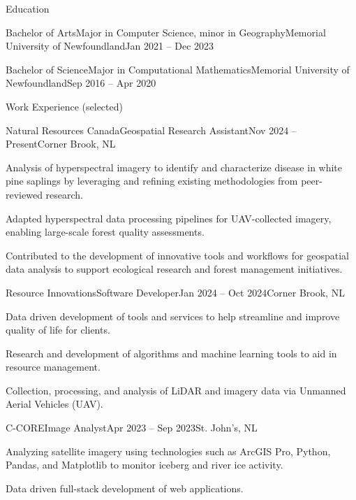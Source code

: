 \documentclass[]{Keenan-Nicholson-Resume}
\begin{document}
\resumeheader
{}
{}
{}
{}
{}

\begin{section}{Education}
    \begin{subsection}{Bachelor of Arts}{Major in Computer Science, minor in Geography}{Memorial University of Newfoundland}{Jan 2021 -- Dec 2023}
    \end{subsection}
    \begin{subsection}{Bachelor of Science}{Major in Computational Mathematics}{Memorial University of Newfoundland}{Sep 2016 -- Apr 2020}
    \end{subsection}
\end{section}

\begin{section}{Work Experience (selected)}
    \begin{subsection}{Natural Resources Canada}{Geospatial Research Assistant}{Nov 2024 -- Present}{Corner Brook, NL}
        \item Analysis of hyperspectral imagery to identify and characterize disease in white pine saplings by leveraging and refining existing methodologies from peer-reviewed research.
        \item Adapted hyperspectral data processing pipelines for UAV-collected imagery, enabling large-scale forest quality assessments.
        \item Contributed to the development of innovative tools and workflows for geospatial data analysis to support ecological research and forest management initiatives.
        
    \end{subsection}
    \begin{subsection}{Resource Innovations}{Software Developer}{Jan 2024 -- Oct 2024}{Corner Brook, NL}
        \item Data driven development of tools and services to help streamline and improve quality of life for clients.
        \item Research and development of algorithms and machine learning tools to aid in resource management.
        \item Collection, processing, and analysis of LiDAR and imagery data via Unmanned Aerial Vehicles (UAV).
    \end{subsection}
    \begin{subsection}{C-CORE}{Image Analyst}{Apr 2023 -- Sep 2023}{St. John's, NL}
        \item Analyzing satellite imagery using technologies such as ArcGIS Pro, Python, Pandas, and Matplotlib to \newline monitor iceberg and river ice activity.
        
        \item Data driven full-stack development of web applications.

    \end{subsection}
\end{section}
\end{document}
